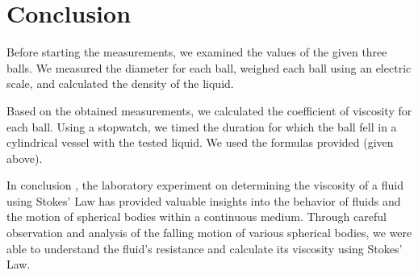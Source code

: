 \section{Conclusion}


Before starting the measurements, we examined the values of the given three balls. We measured the diameter for each ball, weighed each ball using an electric scale, and calculated the density of the liquid.

Based on the obtained measurements, we calculated the coefficient of viscosity for each ball. Using a stopwatch, we timed the duration for which the ball fell in a cylindrical vessel with the tested liquid. We used the formulas provided (given above).

In conclusion , the laboratory experiment on determining the viscosity of a fluid using Stokes' Law has provided valuable insights into the behavior of fluids and the motion of spherical bodies within a continuous medium. Through careful observation and analysis of the falling motion of various spherical bodies, we were able to understand the fluid's resistance and calculate its viscosity using Stokes' Law.